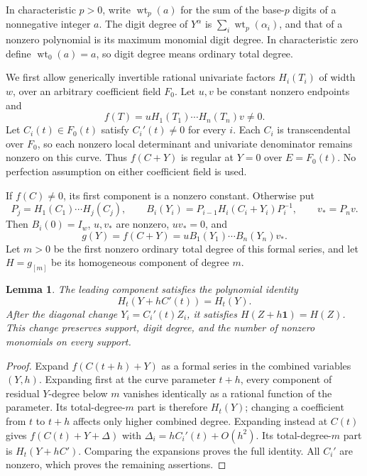 \documentclass[11pt]{article}
\newtheorem{lemma}[theorem]{Lemma}
\newcommand{\wt}{\operatorname{wt}}
\begin{document}
In characteristic $p>0$, write $\wt_p(a)$ for the sum of the base-$p$
digits of a nonnegative integer $a$. The digit degree of $Y^\alpha$ is
$\sum_i\wt_p(\alpha_i)$, and that of a nonzero polynomial is its
maximum monomial digit degree. In characteristic zero define
$\wt_0(a)=a$, so digit degree means ordinary total degree.

We first allow generically invertible rational univariate factors
$H_i(T_i)$ of width $w$, over an arbitrary coefficient field $F_0$.
Let $u,v$ be constant nonzero endpoints and
\[
 f(T)=uH_1(T_1)\cdots H_n(T_n)v\ne0.
\]
Let $C_i(t)\in F_0(t)$ satisfy $C_i'(t)\ne0$ for every $i$.
Each $C_i$ is transcendental over $F_0$, so each nonzero local
determinant and univariate denominator remains nonzero on this curve.
Thus $f(C+Y)$ is regular at $Y=0$ over $E=F_0(t)$.
No perfection assumption on either coefficient field is used.

If $f(C)\ne0$, its first component is a nonzero constant. Otherwise put
\[
 P_j=H_1(C_1)\cdots H_j(C_j),\qquad
 B_i(Y_i)=P_{i-1}H_i(C_i+Y_i)P_i^{-1},\qquad v_*=P_nv.
\]
Then $B_i(0)=I_w$, $u,v_*$ are nonzero, $uv_*=0$, and
\begin{equation}\label{eq:identity}
 g(Y)=f(C+Y)=uB_1(Y_1)\cdots B_n(Y_n)v_*.
\end{equation}
Let $m>0$ be the first nonzero ordinary total degree of this formal
series, and let $H=g_{[m]}$ be its homogeneous component of degree $m$.

\begin{lemma}\label{lem:translation}
The leading component satisfies the polynomial identity
\[
 H_t(Y+hC'(t))=H_t(Y).
\]
After the diagonal change $Y_i=C_i'(t)Z_i$, it satisfies
$H(Z+h\mathbf1)=H(Z)$. This change preserves support, digit degree,
and the number of nonzero monomials on every support.
\end{lemma}
\begin{proof}
Expand $f(C(t+h)+Y)$ as a formal series in the combined variables
$(Y,h)$. Expanding first at the curve parameter $t+h$, every component
of residual $Y$-degree below $m$ vanishes identically as a rational
function of the parameter. Its total-degree-$m$ part is therefore
$H_t(Y)$; changing a coefficient from $t$ to $t+h$ affects only higher
combined degree. Expanding instead at $C(t)$ gives
$f(C(t)+Y+\Delta)$ with
$\Delta_i=hC_i'(t)+O(h^2)$. Its total-degree-$m$ part is
$H_t(Y+hC')$. Comparing the expansions proves the full identity.
All $C_i'$ are nonzero, which proves the remaining assertions.
\end{proof}
\end{document}
